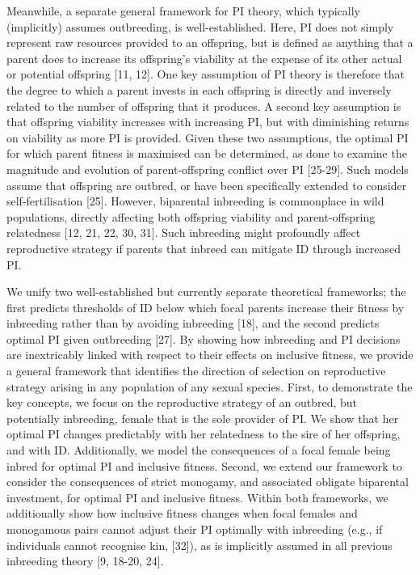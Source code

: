 \documentclass[12pt]{article}
\begin{document}
Meanwhile, a separate general framework for PI theory, which typically (implicitly) assumes outbreeding, is well-established. Here, PI does not simply represent raw resources provided to an offspring, but is defined as anything that a parent does to increase its offspring's viability at the expense of its other actual or potential offspring [11, 12]. One key assumption of PI theory is therefore that the degree to which a parent invests in each offspring is directly and inversely related to the number of offspring that it produces. A second key assumption is that offspring viability increases with increasing PI, but with diminishing returns on viability as more PI is provided. Given these two assumptions, the optimal PI for which parent fitness is maximised can be determined, as done to examine the magnitude and evolution of parent-offspring conflict over PI [25-29]. Such models assume that offspring are outbred, or have been specifically extended to consider self-fertilisation [25]. However, biparental inbreeding is commonplace in wild populations, directly affecting both offspring viability and parent-offspring relatedness [12, 21, 22, 30, 31]. Such inbreeding might profoundly affect reproductive strategy if parents that inbreed can mitigate ID through increased PI.

We unify two well-established but currently separate theoretical frameworks; the first predicts thresholds of ID below which focal parents increase their fitness by inbreeding rather than by avoiding inbreeding [18], and the second predicts optimal PI given outbreeding [27]. By showing how inbreeding and PI decisions are inextricably linked with respect to their effects on inclusive fitness, we provide a general framework that identifies the direction of selection on reproductive strategy arising in any population of any sexual species. First, to demonstrate the key concepts, we focus on the reproductive strategy of an outbred, but potentially inbreeding, female that is the sole provider of PI. We show that her optimal PI changes predictably with her relatedness to the sire of her offspring, and with ID. Additionally, we model the consequences of a focal female being inbred for optimal PI and inclusive fitness. Second, we extend our framework to consider the consequences of strict monogamy, and associated obligate biparental investment, for optimal PI and inclusive fitness. Within both frameworks, we additionally show how inclusive fitness changes when focal females and monogamous pairs cannot adjust their PI optimally with inbreeding (e.g., if individuals cannot recognise kin, [32]), as is implicitly assumed in all previous inbreeding theory [9, 18-20, 24].
\end{document}
